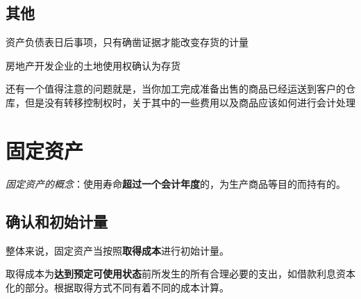 \documentclass[UTF8,12pt]{ctexart}
\numberwithin{equation}{section} %
\numberwithin{figure}{section}
\numberwithin{table}{section}
\begin{document}
	\subsection{其他}
	资产负债表日后事项，只有确凿证据才能改变存货的计量
	
	房地产开发企业的土地使用权确认为存货
	
	还有一个值得注意的问题就是，当你加工完成准备出售的商品已经运送到客户的仓库，但是没有转移控制权时，关于其中的一些费用以及商品应该如何进行会计处理    
	
	\newpage
	\section{固定资产}
	\textit{固定资产的概念}：使用寿命\textbf{超过一个会计年度}的，为生产商品等目的而持有的。
	
	\subsection{确认和初始计量}
	
	整体来说，固定资产当按照\textbf{取得成本}进行初始计量。
	
	取得成本为\textbf{达到预定可使用状态}前所发生的所有合理必要的支出，如借款利息资本化的部分。根据取得方式不同有着不同的成本计算。
	
\end{document}
